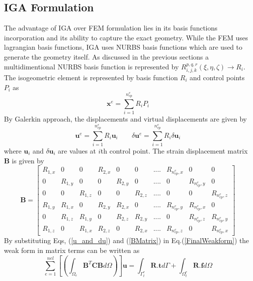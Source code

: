 \documentclass[12pt]{article}
\begin{document}
\subsection{IGA Formulation}
The advantage of IGA over FEM formulation lies in its basis functions incorporation and its ability to capture the exact geometry. While the FEM uses lagrangian basis functions, IGA uses NURBS basis functions which are used to generate the geometry itself. As discussed in the previous sections a multidimentional NURBS basis function is represented by $R_{i,j,k}^{p,q,r}(\xi,\eta,\zeta) \rightarrow R_i$. The isogeometric element  is represented by basis function $R_i$ and control points $P_i$ as
\begin{equation} \label{Co-ordinate}
\textbf{x}^e = \sum_{i=1}^{n_{cp}^e} R_i P_i
\end{equation} 
By Galerkin approach, the displacements and virtual displacements are given by
\begin{equation} \label{u_and_du}
\textbf{u}^e = \sum_{i=1}^{n_{cp}^e} R_i \textbf{u}_i \qquad \delta\textbf{u}^e = \sum_{i=1}^{n_{cp}^e} R_i \delta\textbf{u}_i
\end{equation}
where $\textbf{u}_i$ and $\delta\textbf{u}_i$ are values at $i$th control point.
The strain displacement matrix \textbf{B} is given by
\begin{equation} \label{BMatrix}
\textbf{B} =
\begin{bmatrix}
R_{1,x} & 0 & 0 & R_{2,x} & 0 & 0 & .... & R_{n_{cp}^e,x} & 0 & 0 \\
0 &R_{1,y} & 0 & 0 & R_{2,y} & 0 & .... & 0 & R_{n_{cp}^e,y} & 0  \\
0 & 0 & R_{1,z} &0 & 0 & R_{2,z} & .... &0 & 0 & R_{n_{cp}^e,z}  \\
R_{1,y} & R_{1,x} & 0 & R_{2,y} & R_{2,x} & 0 & .... & R_{n_{cp}^e,y} & R_{n_{cp}^e,x} & 0 \\
0 & R_{1,z} & R_{1,y} & 0 & R_{2,z} & R_{2,y} & .... & 0 & R_{n_{cp}^e,z} & R_{n_{cp}^e,y}\\
R_{1,z} &0 & R_{1,x} & R_{2,z} &0 & R_{2,x} & .... &R_{n_{cp}^e,z} &0 &R_{n_{cp}^e,x}
\end{bmatrix}
\end{equation}
By substituting Eqs, (\ref{u_and_du}) and (\ref{BMatrix}) in Eq.(\ref{FinalWeakform}) the weak form in matrix terms can be written as
\begin{equation} \label{MatrixWeakForm}
\sum_{e=1}^{nel} \left[ \left( \int_{\Omega_e} \textbf{B}^T \textbf{C} \textbf{B} d\Omega \right) \right] \textbf{u} = \int_{\Gamma^e_t} \textbf{R}.\textbf{t} d\Gamma + \int_{\Omega^e_t} \textbf{R}.\textbf{f} d\Omega 
\end{equation}
\end{document}
